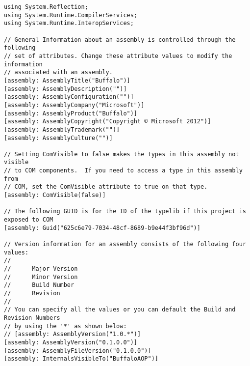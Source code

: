 \begin{lstlisting}[caption={../buffalo/Properties/AssemblyInfo.cs}, label=../buffalo/Properties/AssemblyInfo.cs, frame=tb, basicstyle=\scriptsize]﻿using System.Reflection;
using System.Runtime.CompilerServices;
using System.Runtime.InteropServices;

// General Information about an assembly is controlled through the following 
// set of attributes. Change these attribute values to modify the information
// associated with an assembly.
[assembly: AssemblyTitle("Buffalo")]
[assembly: AssemblyDescription("")]
[assembly: AssemblyConfiguration("")]
[assembly: AssemblyCompany("Microsoft")]
[assembly: AssemblyProduct("Buffalo")]
[assembly: AssemblyCopyright("Copyright © Microsoft 2012")]
[assembly: AssemblyTrademark("")]
[assembly: AssemblyCulture("")]

// Setting ComVisible to false makes the types in this assembly not visible 
// to COM components.  If you need to access a type in this assembly from 
// COM, set the ComVisible attribute to true on that type.
[assembly: ComVisible(false)]

// The following GUID is for the ID of the typelib if this project is exposed to COM
[assembly: Guid("625c6e79-7034-48cf-8689-b9e44f3bf96d")]

// Version information for an assembly consists of the following four values:
//
//      Major Version
//      Minor Version 
//      Build Number
//      Revision
//
// You can specify all the values or you can default the Build and Revision Numbers 
// by using the '*' as shown below:
// [assembly: AssemblyVersion("1.0.*")]
[assembly: AssemblyVersion("0.1.0.0")]
[assembly: AssemblyFileVersion("0.1.0.0")]
[assembly: InternalsVisibleTo("BuffaloAOP")]\end{lstlisting}


